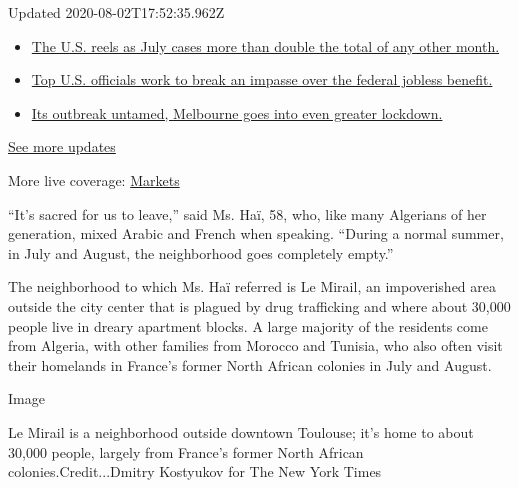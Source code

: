 Updated 2020-08-02T17:52:35.962Z

\begin{itemize}
\tightlist
\item
  \href{https://www.nytimes3xbfgragh.onion/2020/08/01/world/coronavirus-covid-19.html?action=click\&pgtype=Article\&state=default\&region=MAIN_CONTENT_1\&context=storylines_live_updates\#link-34047410}{The
  U.S. reels as July cases more than double the total of any other
  month.}
\item
  \href{https://www.nytimes3xbfgragh.onion/2020/08/01/world/coronavirus-covid-19.html?action=click\&pgtype=Article\&state=default\&region=MAIN_CONTENT_1\&context=storylines_live_updates\#link-780ec966}{Top
  U.S. officials work to break an impasse over the federal jobless
  benefit.}
\item
  \href{https://www.nytimes3xbfgragh.onion/2020/08/01/world/coronavirus-covid-19.html?action=click\&pgtype=Article\&state=default\&region=MAIN_CONTENT_1\&context=storylines_live_updates\#link-2bc8948}{Its
  outbreak untamed, Melbourne goes into even greater lockdown.}
\end{itemize}

\href{https://www.nytimes3xbfgragh.onion/2020/08/01/world/coronavirus-covid-19.html?action=click\&pgtype=Article\&state=default\&region=MAIN_CONTENT_1\&context=storylines_live_updates}{See
more updates}

More live coverage:
\href{https://www.nytimes3xbfgragh.onion/live/2020/07/31/business/stock-market-today-coronavirus?action=click\&pgtype=Article\&state=default\&region=MAIN_CONTENT_1\&context=storylines_live_updates}{Markets}

``It's sacred for us to leave,'' said Ms. Haï, 58, who, like many
Algerians of her generation, mixed Arabic and French when speaking.
``During a normal summer, in July and August, the neighborhood goes
completely empty.''

The neighborhood to which Ms. Haï referred is Le Mirail, an impoverished
area outside the city center that is plagued by drug trafficking and
where about 30,000 people live in dreary apartment blocks. A large
majority of the residents come from Algeria, with other families from
Morocco and Tunisia, who also often visit their homelands in France's
former North African colonies in July and August.

Image

Le Mirail is a neighborhood outside downtown Toulouse; it's home to
about 30,000 people, largely from France's former North African
colonies.Credit...Dmitry Kostyukov for The New York Times

